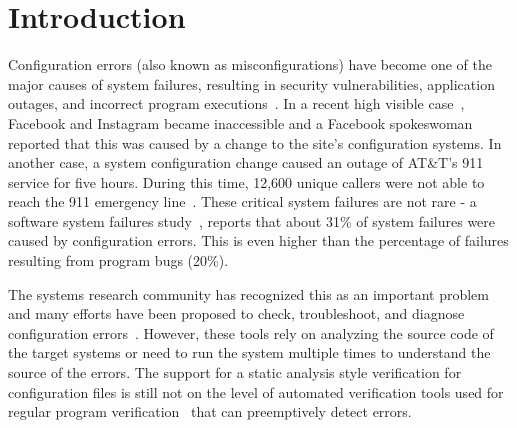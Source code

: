 \section{Introduction}
\label{sec-intro}

Configuration errors (also known as misconfigurations) have become
one of the major causes of system failures, resulting in security vulnerabilities,
application outages, and incorrect program executions~\cite{xu15systems, xu13do, xu15hey}. 
In a recent high visible case~\cite{mashableNews},  
Facebook and Instagram became inaccessible
and a Facebook spokeswoman reported that 
this was caused by a change to the site's configuration systems.
In another case, a system configuration change caused an outage of AT\&T's 911 service for five hours.
During this time, 12,600 unique callers were not able to reach the 911 emergency line~\cite{att-outage}.
These critical system failures are not rare -
a software system failures study~\cite{yin11anempirical},
reports that about 31\% of system failures were caused by 
configuration errors.
This is even higher than the percentage of failures resulting from program bugs (20\%).

The systems research community has recognized this as an important
problem and many efforts have been proposed to
check, troubleshoot, and diagnose configuration 
errors~\cite{attariyan10automating,
su07autobash, whitaker04configuration,xu16early}.
However, these tools rely on analyzing the source code of 
the target systems or need to run the system
multiple times to understand the source of the errors.
The support for a static analysis style verification for configuration files
is still not on the level of
automated verification tools used for regular program 
verification~\cite{Leino10Dafny, PiskacWZ14, BobotFMP15} that can
preemptively detect errors. 

